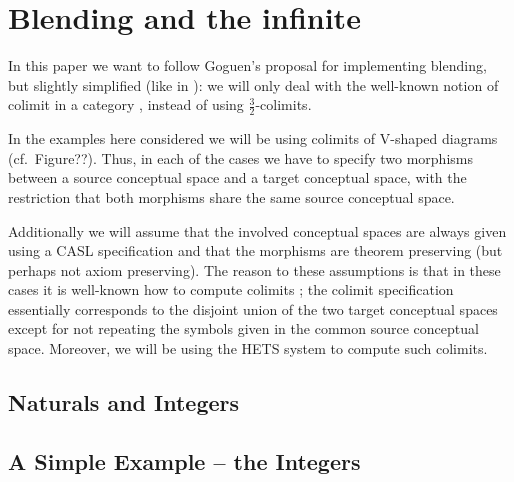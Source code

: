 \section{Blending and the infinite}
\label{sec:infinity}



In this paper we want to follow Goguen's proposal \cite{Go99c} for
implementing blending, but slightly simplified (like in
\cite{KuMoHoBhBa12}): we will only deal with
the well-known notion of colimit in a category \cite{Gog91}, instead of
using $\frac{3}{2}$-colimits.

In the examples here considered we will be using colimits of V-shaped
diagrams (cf.~Figure??). Thus, in each of the cases we have to specify
two morphisms between a source conceptual space and a target conceptual
space, with the restriction that both morphisms share the same source
conceptual space.

Additionally we will assume that the involved conceptual spaces are
always given using a
CASL specification \cite{MoHaSaTa08} and that the morphisms are theorem
preserving (but perhaps not axiom preserving). The reason to these
assumptions
is that in these cases it is well-known how to compute colimits
\cite{Mo98a}; the colimit specification essentially corresponds to the
disjoint union of the two target conceptual spaces except for not
repeating the symbols given in the common source conceptual space.
Moreover, we will be using 
the HETS system \parencite{MossakowskiEA06} to compute such colimits.



\subsection{Naturals and Integers}

\subsection{A Simple Example -- the Integers}

